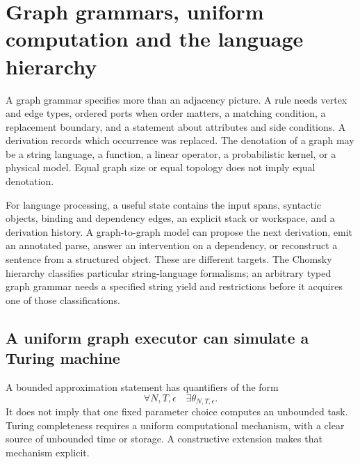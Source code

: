 \section{Graph grammars, uniform computation and the language hierarchy}
\label{sec:wb-language-machines}

A graph grammar specifies more than an adjacency picture. A rule needs vertex and edge types, ordered ports when order matters, a matching condition, a replacement boundary, and a statement about attributes and side conditions. A derivation records which occurrence was replaced. The denotation of a graph may be a string language, a function, a linear operator, a probabilistic kernel, or a physical model. Equal graph size or equal topology does not imply equal denotation.

For language processing, a useful state contains the input spans, syntactic objects, binding and dependency edges, an explicit stack or workspace, and a derivation history. A graph-to-graph model can propose the next derivation, emit an annotated parse, answer an intervention on a dependency, or reconstruct a sentence from a structured object. These are different targets. The Chomsky hierarchy classifies particular string-language formalisms; an arbitrary typed graph grammar needs a specified string yield and restrictions before it acquires one of those classifications.

\subsection{A uniform graph executor can simulate a Turing machine}

A bounded approximation statement has quantifiers of the form
\[
 \forall N,T,\epsilon\quad\exists\theta_{N,T,\epsilon}.
\]
It does not imply that one fixed parameter choice computes an unbounded task. Turing completeness requires a uniform computational mechanism, with a clear source of unbounded time or storage. A constructive extension makes that mechanism explicit.

